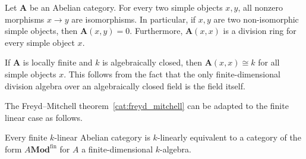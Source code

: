 
    \begin{theorem}\label{cat:schur_lemma}
        Let $\mathbf{A}$ be an Abelian category. For every two simple objects $x,y$, all nonzero morphisms $x\rightarrow y$ are isomorphisms. In particular, if $x,y$ are two non-isomorphic simple objects, then $\mathbf{A}(x,y)=0$. Furthermore, $\mathbf{A}(x,x)$ is a division ring for every simple object $x$.
    \end{theorem}
    \begin{result}
        If $\mathbf{A}$ is locally finite and $k$ is algebraically closed, then $\mathbf{A}(x,x)\cong k$ for all simple objects $x$. This follows from the fact that the only finite-dimensional division algebra over an algebraically closed field is the field itself.
    \end{result}

    The Freyd--Mitchell theorem~\ref{cat:freyd_mitchell} can be adapted to the finite linear case as follows.
    \begin{theorem}[Deligne]
        Every finite $k$-linear Abelian category is $k$-linearly equivalent to a category of the form $A\mathbf{Mod}^{\mathrm{fin}}$ for $A$ a finite-dimensional $k$-algebra.
    \end{theorem}

